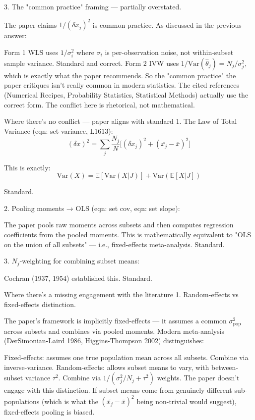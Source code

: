 \documentclass[twoside]{article}
\numberwithin{equation}{section}
\begin{document}
3. The "common practice" framing — partially overstated.

The paper claims $1/(\delta x_j)^2$ is common practice. As discussed in the previous answer:

Form 1 WLS uses $1/\sigma_i^2$ where $\sigma_i$ is per-observation noise, not within-subset sample variance. Standard and correct.
Form 2 IVW uses $1/\text{Var}(\hat\theta_j) = N_j/\sigma_j^2$, which is exactly what the paper recommends.
So the "common practice" the paper critiques isn't really common in modern statistics. The cited references (Numerical Recipes, Probability Statistics, Statistical Methods) actually use the correct form. The conflict here is rhetorical, not mathematical.

Where there's no conflict — paper aligns with standard
1. The Law of Total Variance (eqn: set variance, L1613):
$$(\delta x)^2 = \sum_j \frac{N_j}{N}\bigl[(\delta x_j)^2 + (\overline{x_j} - \overline{x})^2\bigr]$$

This is exactly:
$$\text{Var}(X) = \mathbb{E}[\text{Var}(X|J)] + \text{Var}(\mathbb{E}[X|J])$$

Standard.

2. Pooling moments → OLS (eqn: set cov, eqn: set slope):

The paper pools raw moments across subsets and then computes regression coefficients from the pooled moments. This is mathematically equivalent to "OLS on the union of all subsets" — i.e., fixed-effects meta-analysis.  Standard.

3. $N_j$-weighting for combining subset means:

Cochran (1937, 1954) established this.  Standard.

Where there's a missing engagement with the literature
1. Random-effects vs fixed-effects distinction.

The paper's framework is implicitly fixed-effects — it assumes a common $\sigma_{\text{pop}}^2$ across subsets and combines via pooled moments. Modern meta-analysis (DerSimonian-Laird 1986, Higgins-Thompson 2002) distinguishes:

Fixed-effects: assumes one true population mean across all subsets. Combine via inverse-variance.
Random-effects: allows subset means to vary, with between-subset variance $\tau^2$. Combine via $1/(\sigma_j^2/N_j + \tau^2)$ weights.
The paper doesn't engage with this distinction. If subset means come from genuinely different sub-populations (which is what the $(\overline{x_j} - \overline{x})^2$ being non-trivial would suggest), fixed-effects pooling is biased.
\end{document}
